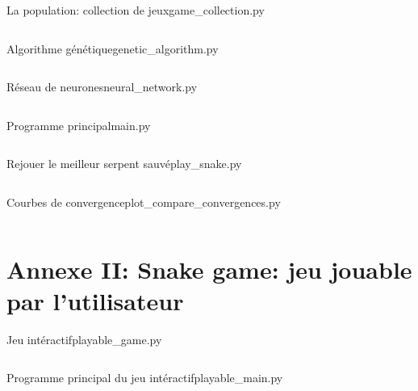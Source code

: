 \documentclass[10pt]{beamer}
\begin{document}
\begin{frame}[t,allowframebreaks]{La population: collection de jeux}{game\_collection.py}
\scriptsize
\inputminted[mathescape]{python}{../../snake-the-game/game_collection.py}
\end{frame}

\begin{frame}[t,allowframebreaks]{Algorithme génétique}{genetic\_algorithm.py}
\scriptsize
\inputminted[mathescape]{python}{../../snake-the-game/genetic_algorithm.py}
\end{frame}

\begin{frame}[t,allowframebreaks]{Réseau de neurones}{neural\_network.py}
\scriptsize
\inputminted[mathescape]{python}{../../snake-the-game/neural_network.py}
\end{frame}

\begin{frame}[t,allowframebreaks]{Programme principal}{main.py}
\scriptsize
\inputminted[mathescape]{python}{../../snake-the-game/main.py}
\end{frame}

\begin{frame}[t,allowframebreaks]{Rejouer le meilleur serpent sauvé}{play\_snake.py}
\scriptsize
\inputminted[mathescape]{python}{../../snake-the-game/play_snake.py}
\end{frame}

\begin{frame}[t,allowframebreaks]{Courbes de convergence}{plot\_compare\_convergences.py}
\scriptsize
\inputminted[mathescape]{python}{../../snake-the-game/plot_compare_convergences.py}
\end{frame}

\section{Annexe II: \textbf{Snake game: jeu jouable par l'utilisateur}}

\begin{frame}[t,allowframebreaks]{Jeu intéractif}{playable\_game.py}
\scriptsize
\inputminted[mathescape]{python}{../../snake-the-game/playable-snake/playable_game.py}
\end{frame}

\begin{frame}[t,allowframebreaks]{Programme principal du jeu intéractif}{playable\_main.py}
\scriptsize
\inputminted[mathescape]{python}{../../snake-the-game/playable-snake/playable_main.py}
\end{frame}
\end{document}
